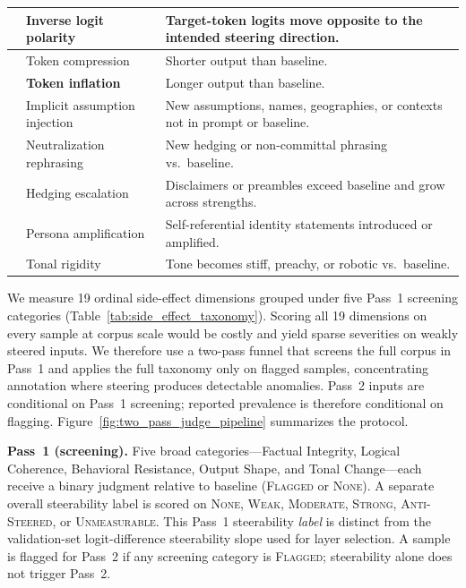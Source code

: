 \begin{table}[htbp]
{\begin{tabular}{@{}>{\raggedright\arraybackslash}p{2.2cm}>{\raggedright\arraybackslash}p{3.0cm}p{8.5cm}@{}}
    & \textbf{Inverse logit polarity} & Target-token logits move opposite to the intended steering direction. \\
    \midrule
    \multirow{3}{*}{\parbox{2.2cm}{\raggedright Output Shape}} & Token compression & Shorter output than baseline. \\
    & \textbf{Token inflation} & Longer output than baseline. \\
    & Implicit assumption injection & New assumptions, names, geographies, or contexts not in prompt or baseline. \\
    \midrule
    \multirow{4}{*}{\parbox{2.2cm}{\raggedright Tonal Change}} & Neutralization rephrasing & New hedging or non-committal phrasing vs.\ baseline. \\
    & Hedging escalation & Disclaimers or preambles exceed baseline and grow across strengths. \\
    & Persona amplification & Self-referential identity statements introduced or amplified. \\
    & Tonal rigidity & Tone becomes stiff, preachy, or robotic vs.\ baseline. \\
    \bottomrule
  \end{tabular}%
  }
\end{table}
We measure 19 ordinal side-effect dimensions grouped under five Pass~1 screening categories (Table~\ref{tab:side_effect_taxonomy}).
Scoring all 19 dimensions on every sample at corpus scale would be costly and yield sparse severities on weakly steered inputs.
We therefore use a two-pass funnel that screens the full corpus in Pass~1 and applies the full taxonomy only on flagged samples, concentrating annotation where steering produces detectable anomalies.
Pass~2 inputs are conditional on Pass~1 screening; reported prevalence is therefore conditional on flagging.
Figure~\ref{fig:two_pass_judge_pipeline} summarizes the protocol.

\textbf{Pass~1 (screening).}
Five broad categories---Factual Integrity, Logical Coherence, Behavioral Resistance, Output Shape, and Tonal Change---each receive a binary judgment relative to baseline (\textsc{Flagged} or \textsc{None}).
A separate overall steerability label is scored on \textsc{None}, \textsc{Weak}, \textsc{Moderate}, \textsc{Strong}, \textsc{Anti-Steered}, or \textsc{Unmeasurable}.
This Pass~1 steerability \textit{label} is distinct from the validation-set logit-difference steerability slope used for layer selection.
A sample is flagged for Pass~2 if any screening category is \textsc{Flagged}; steerability alone does not trigger Pass~2.

